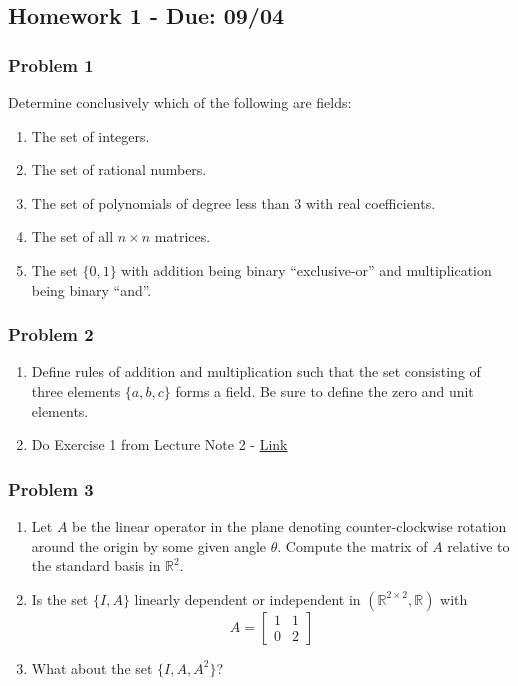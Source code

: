 \subsection{Homework 1 - Due: 09/04}\label{homework-1---due-0904}

\subsubsection{Problem 1}\label{problem-1}

Determine conclusively which of the following are fields:

\begin{enumerate}
\def\labelenumi{\alph{enumi}.}
\tightlist
\item
  The set of integers.
\item
  The set of rational numbers.
\item
  The set of polynomials of degree less than 3 with real coefficients.
\item
  The set of all \(n \times n\) matrices.
\item
  The set \(\{0,1\}\) with addition being binary ``exclusive-or'' and
  multiplication being binary ``and''.
\end{enumerate}

\subsubsection{Problem 2}\label{problem-2}

\begin{enumerate}
\def\labelenumi{\alph{enumi}.}
\tightlist
\item
  Define rules of addition and multiplication such that the set
  consisting of three elements \(\{a, b, c\}\) forms a field. Be sure to
  define the zero and unit elements.
\item
  Do Exercise 1 from Lecture Note 2 -
  \href{/exlecs/lec02.html\#exr-integersmodp}{Link}
\end{enumerate}

\subsubsection{Problem 3}\label{problem-3}

\begin{enumerate}
\def\labelenumi{\alph{enumi}.}
\tightlist
\item
  Let \(A\) be the linear operator in the plane denoting
  counter-clockwise rotation around the origin by some given angle
  \(\theta\). Compute the matrix of \(A\) relative to the standard basis
  in \(\mathbb{R}^2\).
\item
  Is the set \(\{I, A\}\) linearly dependent or independent in
  \(\left(\mathbb{R}^{2 \times 2}, \mathbb{R}\right)\) with
  \[ A = \begin{bmatrix} 1 & 1 \\ 0 & 2 \end{bmatrix} \]
\item
  What about the set \(\{I, A, A^2\}\)?
\end{enumerate}

